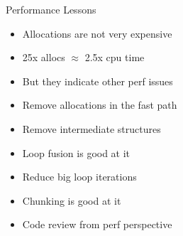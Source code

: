 \documentclass[17pt]{beamer}
\begin{document}
\begin{frame}{Performance Lessons}{}
\begin{itemize}
\item Allocations are not very expensive
\item 25x allocs $\approx$ 2.5x cpu time
\item But they indicate other perf issues
\item Remove allocations in the fast path
\item Remove intermediate structures
\item Loop fusion is good at it
\item Reduce big loop iterations
\item Chunking is good at it
\item Code review from perf perspective
\end{itemize}
\end{frame}

\end{document}
